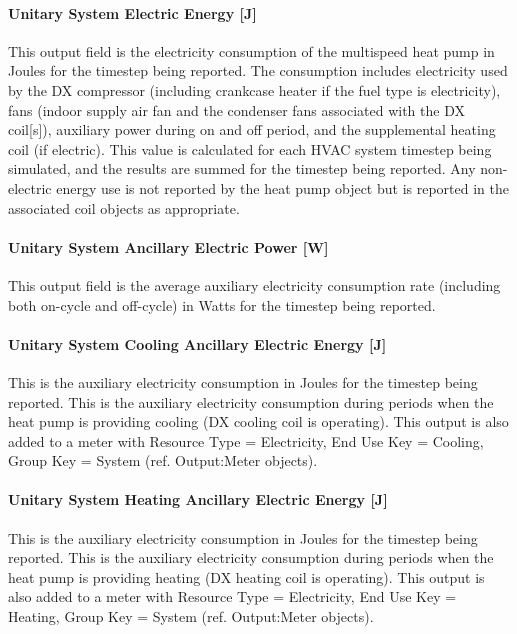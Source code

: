\paragraph{Unitary System Electric Energy {[}J{]}}\label{unitary-system-electric-energy-j-1}

This output field is the electricity consumption of the multispeed heat pump in Joules for the timestep being reported. The consumption includes electricity used by the DX compressor (including crankcase heater if the fuel type is electricity), fans (indoor supply air fan and the condenser fans associated with the DX coil{[}s{]}), auxiliary power during on and off period, and the supplemental heating coil (if electric). This value is calculated for each HVAC system timestep being simulated, and the results are summed for the timestep being reported. Any non-electric energy use is not reported by the heat pump object but is reported in the associated coil objects as appropriate.

\paragraph{Unitary System Ancillary Electric Power {[}W{]}}\label{unitary-system-ancillary-electric-power-w-1}

This output field is the average auxiliary electricity consumption rate (including both on-cycle and off-cycle) in Watts for the timestep being reported.

\paragraph{Unitary System Cooling Ancillary Electric Energy {[}J{]}}\label{unitary-system-cooling-ancillary-electric-energy-j-1}

This is the auxiliary electricity consumption in Joules for the timestep being reported. This is the auxiliary electricity consumption during periods when the heat pump is providing cooling (DX cooling coil is operating). This output is also added to a meter with Resource Type = Electricity, End Use Key = Cooling, Group Key = System (ref. Output:Meter objects).

\paragraph{Unitary System Heating Ancillary Electric Energy {[}J{]}}\label{unitary-system-heating-ancillary-electric-energy-j-1}

This is the auxiliary electricity consumption in Joules for the timestep being reported. This is the auxiliary electricity consumption during periods when the heat pump is providing heating (DX heating coil is operating). This output is also added to a meter with Resource Type = Electricity, End Use Key = Heating, Group Key = System (ref. Output:Meter objects).

